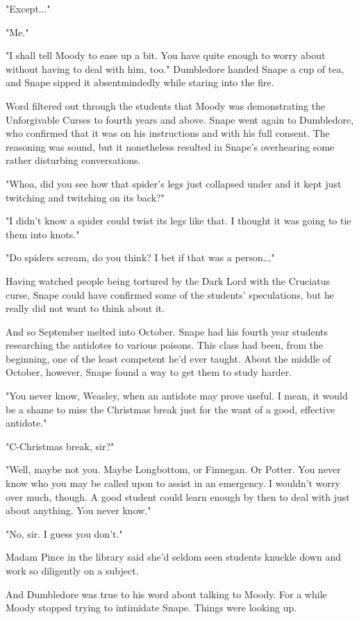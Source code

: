 "Except..."

"Me."

"I shall tell Moody to ease up a bit. You have quite enough to worry about without having to deal with him, too." Dumbledore handed Snape a cup of tea, and Snape sipped it absentmindedly while staring into the fire.

Word filtered out through the students that Moody was demonstrating the Unforgivable Curses to fourth years and above. Snape went again to Dumbledore, who confirmed that it was on his instructions and with his full consent. The reasoning was sound, but it nonetheless resulted in Snape's overhearing some rather disturbing conversations.

"Whoa, did you see how that spider's legs just collapsed under and it kept just twitching and twitching on its back?"

"I didn't know a spider could twist its legs like that. I thought it was going to tie them into knots."

"Do spiders scream, do you think? I bet if that was a person..."

Having watched people being tortured by the Dark Lord with the Cruciatus curse, Snape could have confirmed some of the students' speculations, but he really did not want to think about it.

And so September melted into October. Snape had his fourth year students researching the antidotes to various poisons. This class had been, from the beginning, one of the least competent he'd ever taught. About the middle of October, however, Snape found a way to get them to study harder.

"You never know, Weasley, when an antidote may prove useful. I mean, it would be a shame to miss the Christmas break just for the want of a good, effective antidote."

"C-Christmas break, sir?"

"Well, maybe not you. Maybe Longbottom, or Finnegan. Or Potter. You never know who you may be called upon to assist in an emergency. I wouldn't worry over much, though. A good student could learn enough by then to deal with just about anything. You never know."

"No, sir. I guess you don't."

Madam Pince in the library said she'd seldom seen students knuckle down and work so diligently on a subject.

And Dumbledore was true to his word about talking to Moody. For a while Moody stopped trying to intimidate Snape. Things were looking up.


